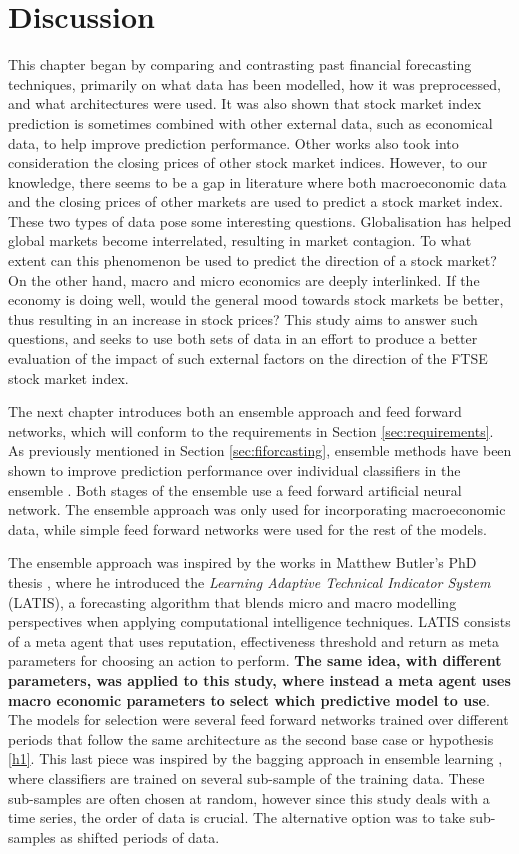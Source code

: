 \documentclass{UoYCSproject}
\begin{document}
\section{Discussion}
\label{sec:discussion}
This chapter began by comparing and contrasting past financial forecasting techniques, primarily on what data has been modelled, how it was preprocessed, and what architectures were used. It was also shown that stock market index prediction is sometimes combined with other external data, such as economical data, to help improve prediction performance. Other works also took into consideration the closing prices of other stock market indices. However, to our knowledge, there seems to be a gap in literature where both macroeconomic data and the closing prices of other markets are used to predict a stock market index. These two types of data pose some interesting questions. Globalisation has helped global markets become interrelated, resulting in market contagion. To what extent can this phenomenon be used to predict the direction of a stock market? On the other hand, macro and micro economics are deeply interlinked. If the economy is doing well, would the general mood towards stock markets be better, thus resulting in an increase in stock prices? This study aims to answer such questions, and seeks to use both sets of data in an effort to produce a better evaluation of the impact of such external factors on the direction of the FTSE stock market index.  

The next chapter introduces both an ensemble approach and feed forward networks, which will conform to the requirements in Section \ref{sec:requirements}. As previously mentioned in Section \ref{sec:fiforcasting}, ensemble methods have been shown to improve prediction performance over individual classifiers in the ensemble \cite{opitz1999popular}. Both stages of the ensemble use a feed forward artificial neural network. The ensemble approach was only used for incorporating macroeconomic data, while simple feed forward networks were used for the rest of the models.

The ensemble approach was inspired by the works in Matthew Butler's PhD thesis \cite{butler2012computational}, where he introduced the \textit{Learning Adaptive Technical Indicator System} (LATIS), a forecasting algorithm that blends micro and macro modelling perspectives when applying computational intelligence techniques. LATIS consists of a meta agent that uses reputation, effectiveness threshold and return as meta parameters for choosing an action to perform.\textbf{ The same idea, with different parameters, was applied to this study, where instead a meta agent uses macro economic parameters to select which predictive model to use}. The models for selection were several feed forward networks trained over different periods that follow the same architecture as the second base case or hypothesis \ref{h1}. This last piece was inspired by the bagging approach in ensemble learning \cite{breiman1996bagging}, where classifiers are trained on several sub-sample of the training data. These sub-samples are often chosen at random, however since this study deals with a time series, the order of data is crucial. The alternative option was to take sub-samples as shifted periods of data.
\end{document}
